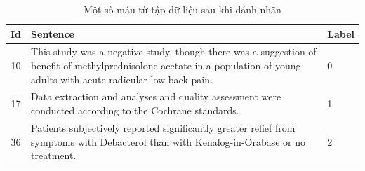 

\begin{table}[H]
\centering
\begin{minipage}{1.0\textwidth}
\caption{Một số mẫu từ tập dữ liệu sau khi đánh nhãn} \label{table:labeleddata}
\label{table:labeleddata}
\begin{tabular}{ |c|p{}|l| } 
 \hline
 \textbf{Id} & \textbf{Sentence} & \textbf{Label} \\ 
 \hline
 10 & This study was a negative study, though there was a suggestion of benefit of methylprednisolone acetate in a population of young adults with acute radicular low back pain. & 0\\ \hline
 17 & Data extraction and analyses and quality assessment were conducted according to the Cochrane standards. & 1\\ \hline
 36 & Patients subjectively reported significantly greater relief from symptoms with Debacterol than with Kenalog-in-Orabase or no treatment. & 2\\ 
 \hline
\end{tabular}
\end{minipage}
\end{table}

